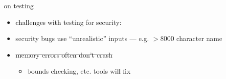 \begin{frame}{on testing}
    \begin{itemize}
    \item challenges with testing for security:
    \vspace{.5cm}
    \item security bugs use ``unrealistic'' inputs --- e.g. $>8000$ character name
    \item \sout<2>{memory errors often don't crash}
        \begin{itemize}
        \item<2> bounds checking, etc. tools will fix
        \end{itemize}
    \end{itemize}
\end{frame}

